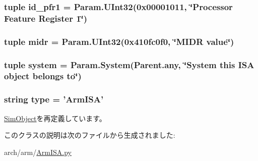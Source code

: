 \label{classArmISA_1_1ArmISA_a248253e22ef8371f8e6f6ae8b2288818}
\hypertarget{classArmISA_1_1ArmISA_a9243b12125ce93324070204d251b3750}{
\subsubsection[{id\_\-pfr1}]{\setlength{\rightskip}{0pt plus 5cm}tuple {\bf id\_\-pfr1} = Param.UInt32(0x00001011, \char`\"{}Processor Feature Register 1\char`\"{})}}
\label{classArmISA_1_1ArmISA_a9243b12125ce93324070204d251b3750}
\hypertarget{classArmISA_1_1ArmISA_aeca52158cd161ac79fce3c4406d54fbc}{
\subsubsection[{midr}]{\setlength{\rightskip}{0pt plus 5cm}tuple {\bf midr} = Param.UInt32(0x410fc0f0, \char`\"{}MIDR value\char`\"{})}}
\label{classArmISA_1_1ArmISA_aeca52158cd161ac79fce3c4406d54fbc}
\hypertarget{classArmISA_1_1ArmISA_ab737471139f5a296e5b26e8a0e1b0744}{
\subsubsection[{system}]{\setlength{\rightskip}{0pt plus 5cm}tuple {\bf system} = Param.System(Parent.any, \char`\"{}System this {\bf ISA} object belongs to\char`\"{})}}
\label{classArmISA_1_1ArmISA_ab737471139f5a296e5b26e8a0e1b0744}
\hypertarget{classArmISA_1_1ArmISA_acce15679d830831b0bbe8ebc2a60b2ca}{
\subsubsection[{type}]{\setlength{\rightskip}{0pt plus 5cm}string {\bf type} = '{\bf ArmISA}'}}
\label{classArmISA_1_1ArmISA_acce15679d830831b0bbe8ebc2a60b2ca}


\hyperlink{classm5_1_1SimObject_1_1SimObject_acce15679d830831b0bbe8ebc2a60b2ca}{SimObject}を再定義しています。

このクラスの説明は次のファイルから生成されました:\begin{DoxyCompactItemize}
\item 
arch/arm/\hyperlink{ArmISA_8py}{ArmISA.py}\end{DoxyCompactItemize}
